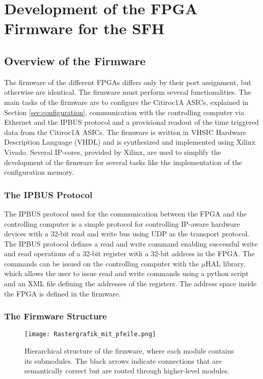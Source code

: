 \chapter{Development of the FPGA Firmware for the SFH}\label{cha:development}
\noindent
\section{Overview of the Firmware}
The firmware of the different FPGAs differs only by their port assignment, but otherwise are identical.
\newline
The firmware must perform several functionalities.
\newline
The main tasks of the firmware are to configure the Citiroc1A ASICs, explained in Section \ref{sec:configuration},
communication with the controlling computer via Ethernet and the IPBUS protocol and a provisional readout of the time triggered data from the Citiroc1A ASICs.
\newline
The firmware is written in VHSIC Hardware Description Language (VHDL) and is synthesized and implemented using Xilinx Vivado.
Several IP-cores, provided by Xilinx, are used to simplify the development of the firmware for several tasks like the implementation of the configuration memory.
\subsection{The IPBUS Protocol}
The IPBUS protocol used for the communication between the FPGA and the controlling computer is a simple protocol for controlling IP-aware hardware devices with a 32-bit read and write bus using UDP as the transport protocol.\autocite{IPBUS_article}
\newline
The IPBUS protocol defines a read and write command enabling successful write and read operations of a 32-bit register with a 32-bit address in the FPGA.    
\newline
The commands can be issued on the controlling computer with the $\mu$HAL library, which allows the user to issue read and write commands using a python script and an XML file defining the addresses of the registers.\autocite{IPBUS_article}
\newline
The address space inside the FPGA is defined in the firmware. 
\subsection{The Firmware Structure}

\begin{figure}[H]
    \centering
    \texttt{[image: Rastergrafik\_mit\_pfeile.png]}%
    \caption{Hierarchical structure of the firmware, where each module contains its submodules.
    The black arrows indicate connections that are semantically correct but are routed through higher-level modules.}
    \label{fig:Firmware_structure}
\end{figure}

